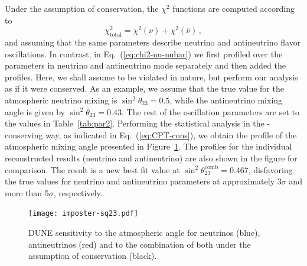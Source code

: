 Under the assumption of  conservation, the $\chi^2$ functions are computed according to
%
\begin{equation}
 \chi^2_{\text{total}}=\chi^2(\nu)+\chi^2(\overline{\nu})\, ,
 \label{eq:CPT-cons}
\end{equation}
%
and assuming that the same parameters describe neutrino and antineutrino flavor oscillations. In contrast, in Eq.~(\ref{eq:chi2-nu-nubar}) we first profiled over the parameters in neutrino and antineutrino mode separately and then added the profiles. Here, we shall assume  to be violated in nature, but perform our analysis as if it were conserved. As an example, we assume that the true value for the atmospheric neutrino mixing is $\sin^2\theta_{23}=0.5$, while the antineutrino mixing angle is given by $\sin^2\overline{\theta}_{23}=0.43$. The rest of the oscillation parameters are set to the values in Table~\ref{tab:par2}. Performing the statistical analysis in the -conserving way, as indicated in Eq.~(\ref{eq:CPT-cons}), we obtain the profile of the atmospheric mixing angle presented in Figure~\ref{fig:imposter-sq23}. The profiles for the individual reconstructed results (neutrino and antineutrino) are also shown in the figure for comparison.
The result is a new best fit value at $\sin^2\theta^\text{comb}_{23}=0.467$, disfavoring the true values for neutrino and antineutrino parameters at approximately 3$\sigma$ and more than 5$\sigma$, respectively. 

\begin{figure}[!htb]
 \centering
        \texttt{[image: imposter-sq23.pdf]}
        \caption[Sensitivity to atmospheric angle for (anti)$\nu$'s, and combination under CPT conservation]{DUNE sensitivity to the atmospheric angle for neutrinos (blue), antineutrinos (red) and to the combination of both under the assumption of  conservation (black).
         }
	\label{fig:imposter-sq23}
\end{figure}

